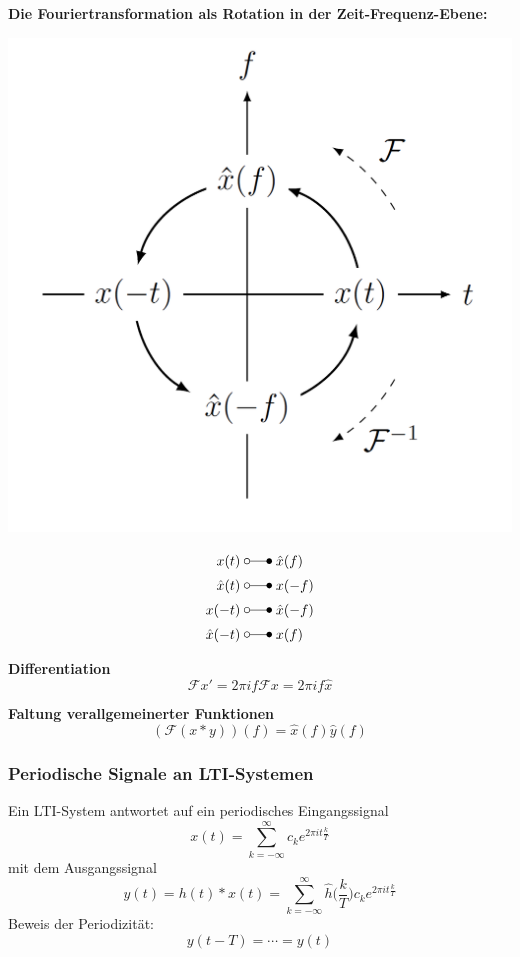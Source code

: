 \textbf{Die Fouriertransformation als Rotation in der Zeit-Frequenz-Ebene:}
\begin{center}
    \includegraphics[width=0.6\linewidth]{img/FT_Rotation.png}
\end{center}
\begin{align*}
    x(t) \;       & \laplace\; \hat{x}(f)  \\
    \hat{x}(t) \; & \laplace\; x(-f)       \\
    x(-t) \;      & \laplace\; \hat{x}(-f) \\
    \hat{x}(-t)\; & \laplace\; x(f)
\end{align*}

\textbf{Differentiation}
\begin{equation}
    \mathcal{F}x'=2\pi if\mathcal{F}x=2\pi if\hat{x}
\end{equation}

\textbf{Faltung verallgemeinerter Funktionen}
\begin{equation}
    (\mathcal{F}(x*y))(f) = \hat{x}(f)\hat{y}(f)
\end{equation}

\subsubsection{Periodische Signale an LTI-Systemen}
Ein LTI-System antwortet auf ein periodisches Eingangssignal
\begin{equation*}
    x(t)=\sum_{k=-\infty}^{\infty}c_k e^{2\pi it\frac{k}{T}}
\end{equation*}
mit dem Ausgangssignal
\begin{equation*}
    y(t)=h(t)*x(t)=\sum_{k=-\infty}^{\infty}\hat{h}\Biggl(\frac{k}{T}\Biggr)c_k e^{2\pi it\frac{k}{T}}
\end{equation*}
Beweis der Periodizität:
\begin{equation*}
    y(t-T)=\cdots=y(t)
\end{equation*}

